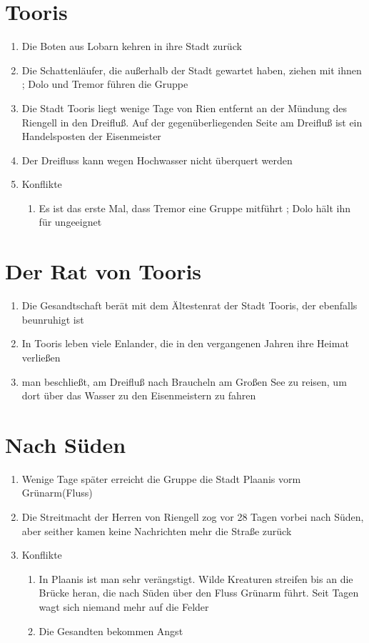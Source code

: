 \documentclass[12pt,a4paper,onecolumn,twoside,ngerman]{book}
\newcommand{\Enland}{Enland}
\newcommand{\Schattenlaufer}{Schattenläufer}
\newcommand{\Dolo}{Dolo}
\newcommand{\Tremor}{Tremor}
\newcommand{\Lobarn}{Lobarn}
\newcommand{\Rhingell}{Riengell}
\newcommand{\Rhin}{Rien}
\newcommand{\Dreifluss}{Dreifluß}
\newcommand{\Toris}{Tooris}
\newcommand{\Planis}{Plaanis}
\newcommand{\Grunarm}{Grünarm}
\newcommand{\Braucheln}{Braucheln}
\newcommand{\Eisenmeister}{Eisenmeister}
\begin{document}
\section{\Toris}
\begin{enumerate}
  \item Die Boten aus {\Lobarn} kehren in ihre Stadt zurück
  \item Die {\Schattenlaufer}, die außerhalb der Stadt gewartet haben, ziehen mit ihnen ; {\Dolo} und {\Tremor} führen die Gruppe
  \item Die Stadt {\Toris} liegt wenige Tage von {\Rhin} entfernt an der Mündung des {\Rhingell} in den {\Dreifluss}. Auf der gegenüberliegenden Seite am {\Dreifluss} ist ein Handelsposten der {\Eisenmeister}
  \item Der Dreifluss kann wegen Hochwasser nicht überquert werden
  \item Konflikte
  \begin{enumerate}
    \item Es ist das erste Mal, dass {\Tremor} eine Gruppe mitführt ; {\Dolo} hält ihn für ungeeignet
  \end{enumerate}
\end{enumerate}

\section{Der Rat von \Toris}
\begin{enumerate}
  \item Die Gesandtschaft berät mit dem Ältestenrat der Stadt {\Toris}, der ebenfalls beunruhigt ist
  \item In {\Toris} leben viele {\Enland}er, die in den vergangenen Jahren ihre Heimat verließen
  \item man beschließt, am {\Dreifluss} nach {\Braucheln} am Großen See zu reisen, um dort über das Wasser zu den {\Eisenmeister}n zu fahren
\end{enumerate}

\section{Nach Süden}
\begin{enumerate}
  \item Wenige Tage später erreicht die Gruppe die Stadt {\Planis} vorm {\Grunarm}(Fluss)
  \item Die Streitmacht der Herren von {\Rhingell} zog vor 28 Tagen vorbei nach Süden, aber seither kamen keine Nachrichten mehr die Straße zurück
  \item Konflikte
  \begin{enumerate}
    \item In {\Planis} ist man sehr verängstigt. Wilde Kreaturen streifen bis an die Brücke heran, die nach Süden über den Fluss {\Grunarm} führt. Seit Tagen wagt sich niemand mehr auf die Felder
    \item Die Gesandten bekommen Angst
  \end{enumerate}
\end{enumerate}
 
\end{document}
